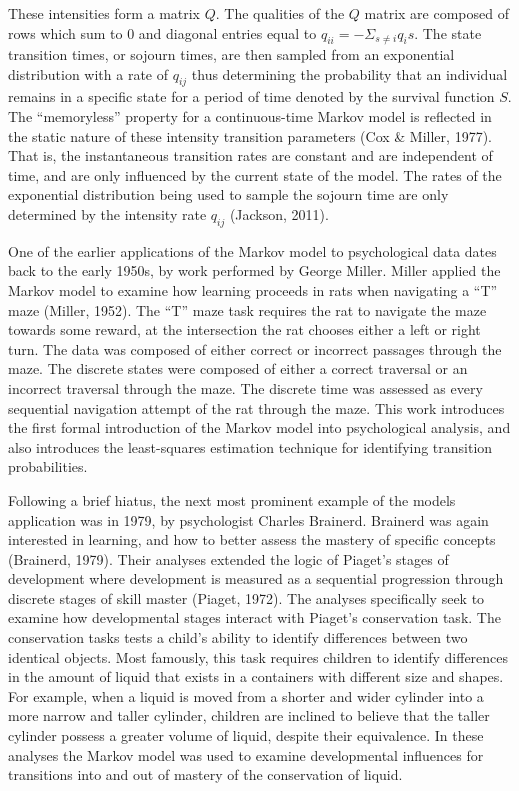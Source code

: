 \documentclass[12pt]{./styles/outhesis}
\begin{document}
These intensities form a matrix \(Q\). The qualities of the \(Q\) matrix
are composed of rows which sum to 0 and diagonal entries equal to
\(q_{ii} = -\Sigma_{s\neq i}q_is\). The state transition times, or
sojourn times, are then sampled from an exponential distribution with a
rate of \(q_{ij}\) thus determining the probability that an individual
remains in a specific state for a period of time denoted by the survival
function \(S\). The ``memoryless'' property for a
continuous-time Markov model is reflected in the static nature of these
intensity transition parameters (Cox \& Miller, 1977). That is, the
instantaneous transition rates are constant and are independent of time,
and are only influenced by the current state of the model. The rates of
the exponential distribution being used to sample the sojourn time are
only determined by the intensity rate \(q_{ij}\) (Jackson, 2011).

One of the earlier applications of the Markov model to psychological
data dates back to the early 1950s, by work performed by George Miller.
Miller applied the Markov model to examine how learning proceeds in rats
when navigating a ``T'' maze (Miller, 1952). The ``T'' maze task
requires the rat to navigate the maze towards some reward, at the
intersection the rat chooses either a left or right turn. The data was
composed of either correct or incorrect passages through the maze. The
discrete states were composed of either a correct traversal or an
incorrect traversal through the maze. The discrete time was assessed as
every sequential navigation attempt of the rat through the maze. This
work introduces the first formal introduction of the Markov model into
psychological analysis, and also introduces the least-squares
estimation technique for identifying transition probabilities.

Following a brief hiatus, the next most prominent example of the models
application was in 1979, by psychologist Charles Brainerd. Brainerd was
again interested in learning, and how to better assess the mastery of
specific concepts (Brainerd, 1979). Their analyses extended the logic of
Piaget's stages of development where development is measured as a
sequential progression through discrete stages of skill master (Piaget,
1972). The analyses specifically seek to examine how developmental
stages interact with Piaget's conservation task. The conservation tasks
tests a child's ability to identify differences between two identical
objects. Most famously, this task requires children to identify
differences in the amount of liquid that exists in a containers with
different size and shapes. For example, when a liquid is moved from a
shorter and wider cylinder into a more narrow and taller cylinder,
children are inclined to believe that the taller cylinder possess a
greater volume of liquid, despite their equivalence. In these analyses
the Markov model was used to examine developmental influences for
transitions into and out of mastery of the conservation of liquid.
\end{document}
